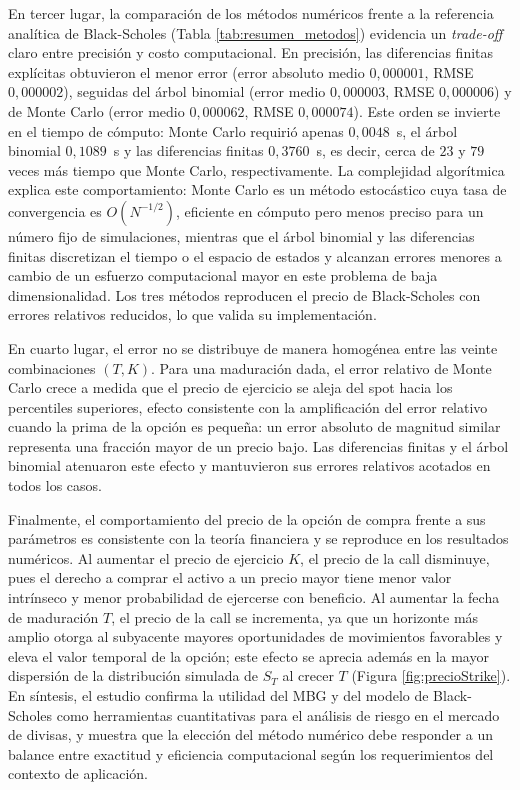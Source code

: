 \documentclass{article}
\begin{document}
En tercer lugar, la comparación de los métodos numéricos frente a la referencia analítica de Black-Scholes (Tabla \ref{tab:resumen_metodos}) evidencia un \textit{trade-off} claro entre precisión y costo computacional. En precisión, las diferencias finitas explícitas obtuvieron el menor error (error absoluto medio $0{,}000001$, RMSE $0{,}000002$), seguidas del árbol binomial (error medio $0{,}000003$, RMSE $0{,}000006$) y de Monte Carlo (error medio $0{,}000062$, RMSE $0{,}000074$). Este orden se invierte en el tiempo de cómputo: Monte Carlo requirió apenas $0{,}0048$~s, el árbol binomial $0{,}1089$~s y las diferencias finitas $0{,}3760$~s, es decir, cerca de $23$ y $79$ veces más tiempo que Monte Carlo, respectivamente. La complejidad algorítmica explica este comportamiento: Monte Carlo es un método estocástico cuya tasa de convergencia es $O(N^{-1/2})$, eficiente en cómputo pero menos preciso para un número fijo de simulaciones, mientras que el árbol binomial y las diferencias finitas discretizan el tiempo o el espacio de estados y alcanzan errores menores a cambio de un esfuerzo computacional mayor en este problema de baja dimensionalidad. Los tres métodos reproducen el precio de Black-Scholes con errores relativos reducidos, lo que valida su implementación.

En cuarto lugar, el error no se distribuye de manera homogénea entre las veinte combinaciones $(T,K)$. Para una maduración dada, el error relativo de Monte Carlo crece a medida que el precio de ejercicio se aleja del spot hacia los percentiles superiores, efecto consistente con la amplificación del error relativo cuando la prima de la opción es pequeña: un error absoluto de magnitud similar representa una fracción mayor de un precio bajo. Las diferencias finitas y el árbol binomial atenuaron este efecto y mantuvieron sus errores relativos acotados en todos los casos.

Finalmente, el comportamiento del precio de la opción de compra frente a sus parámetros es consistente con la teoría financiera y se reproduce en los resultados numéricos. Al aumentar el precio de ejercicio $K$, el precio de la call disminuye, pues el derecho a comprar el activo a un precio mayor tiene menor valor intrínseco y menor probabilidad de ejercerse con beneficio. Al aumentar la fecha de maduración $T$, el precio de la call se incrementa, ya que un horizonte más amplio otorga al subyacente mayores oportunidades de movimientos favorables y eleva el valor temporal de la opción; este efecto se aprecia además en la mayor dispersión de la distribución simulada de $S_T$ al crecer $T$ (Figura \ref{fig:precioStrike}). En síntesis, el estudio confirma la utilidad del MBG y del modelo de Black-Scholes como herramientas cuantitativas para el análisis de riesgo en el mercado de divisas, y muestra que la elección del método numérico debe responder a un balance entre exactitud y eficiencia computacional según los requerimientos del contexto de aplicación.




\nocite{einstein1905brownian, siegrist2022brownian}
\nocite{metricgate2025mbg}
\nocite{blackscholes1973, merton1973}
\nocite{ibm_montecarlo}
\nocite{coxrossrubinstein1979}
\nocite{gurevich2008numerical}
\end{document}
